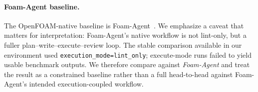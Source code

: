 \documentclass{article}
\begin{document}
\paragraph{Foam-Agent baseline.}
The OpenFOAM-native baseline is Foam-Agent~\citep{foamagent2025}. We emphasize a caveat that matters for interpretation: Foam-Agent's native workflow is not lint-only, but a fuller plan--write--execute--review loop. The stable comparison available in our environment used \texttt{execution\_mode=lint\_only}; execute-mode runs failed to yield usable benchmark outputs. We therefore compare against \emph{Foam-Agent} and treat the result as a constrained baseline rather than a full head-to-head against Foam-Agent's intended execution-coupled workflow.

\begin{table}[t]
  \caption{OpenFOAM transfer-study summary on the 5-task subset. Mean score is the file-text-and-coverage metric described above. \emph{Full coverage} is the number of tasks for which all required files were produced.}
  \label{tab:openfoam-summary}
  \centering
  \small
\end{table}
\end{document}
